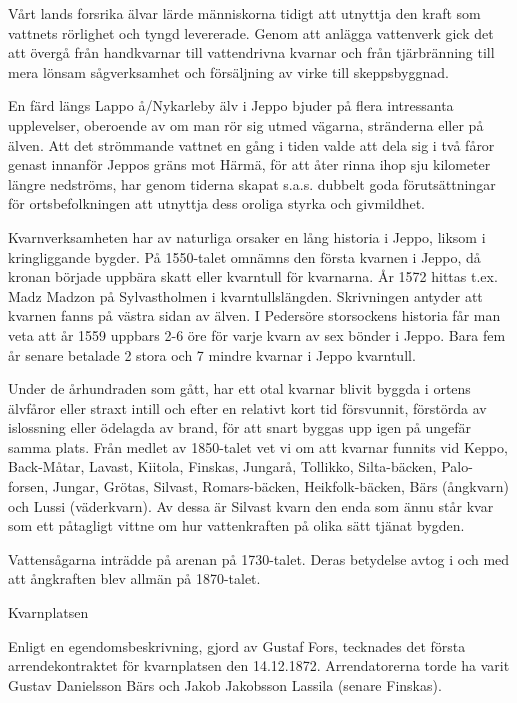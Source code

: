 
Vårt lands forsrika älvar lärde människorna tidigt att utnyttja den kraft som vattnets rörlighet och tyngd levererade. Genom att anlägga vattenverk gick det att övergå från handkvarnar till vattendrivna kvarnar och från tjärbränning till mera lönsam sågverksamhet och försäljning av virke till skeppsbyggnad.


En färd längs Lappo å/Nykarleby älv i Jeppo bjuder på flera intressanta upplevelser, oberoende av om man rör sig utmed vägarna, stränderna eller på älven. Att det strömmande vattnet en gång i tiden valde att dela sig i två fåror genast innanför Jeppos gräns mot Härmä, för att åter rinna ihop sju kilometer längre nedströms, har genom tiderna skapat s.a.s. dubbelt goda förutsättningar för ortsbefolkningen att utnyttja dess oroliga styrka och givmildhet.

Kvarnverksamheten har av naturliga orsaker en lång historia i Jeppo, liksom i kringliggande bygder. På 1550-talet omnämns den första kvarnen i Jeppo, då kronan började uppbära skatt eller kvarntull för kvarnarna. År 1572 hittas t.ex. Madz Madzon på Sylvastholmen i kvarntullslängden. Skrivningen antyder att kvarnen fanns på västra sidan av älven. I Pedersöre storsockens historia får man veta att år 1559 uppbars 2-6 öre för varje kvarn av sex bönder i Jeppo. Bara fem år senare betalade 2 stora och 7 mindre kvarnar i Jeppo kvarntull.

Under de århundraden som gått, har ett otal kvarnar blivit byggda i ortens  älvfåror eller straxt intill och efter en relativt kort tid försvunnit, förstörda av islossning eller ödelagda av brand, för att snart byggas upp igen på ungefär samma plats. Från medlet av 1850-talet vet vi om att kvarnar funnits vid Keppo, Back-Måtar, Lavast, Kiitola, Finskas, Jungarå, Tollikko, Silta-bäcken, Palo-forsen, Jungar, Grötas, Silvast, Romars-bäcken, Heikfolk-bäcken, Bärs (ångkvarn) och Lussi (väderkvarn). Av dessa är Silvast kvarn den enda som ännu står kvar som ett påtagligt vittne om hur vattenkraften på olika sätt tjänat bygden.

Vattensågarna inträdde på arenan på 1730-talet. Deras betydelse avtog i och med att ångkraften blev allmän på 1870-talet.


Kvarnplatsen

Enligt en egendomsbeskrivning, gjord av Gustaf Fors, tecknades det första arrendekontraktet för kvarnplatsen den 14.12.1872. Arrendatorerna torde ha varit Gustav Danielsson Bärs och Jakob Jakobsson Lassila (senare Finskas).

